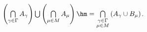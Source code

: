  $\left(\bigcap\limits_{\gamma\in \Gamma} A_\gamma\right)\bigcup
            \left(\bigcap\limits_{\mu\in M} A_\mu\right)\hm=\bigcap\limits_{\substack{\gamma\in \Gamma \\ \mu\in M}} \left(A_\gamma\cup B_\mu\right)$.
        